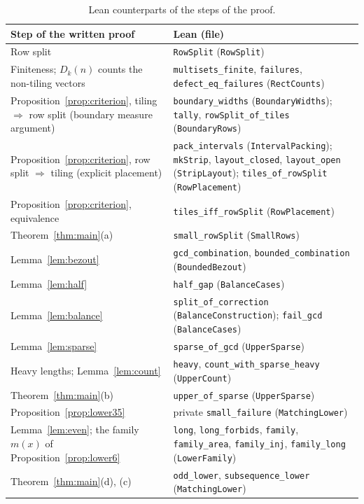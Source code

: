 \documentclass[11pt]{article}
\theoremstyle{definition}
\theoremstyle{remark}
\begin{document}
{\begin{table}[ht]
\centering\footnotesize
\renewcommand{\arraystretch}{1.05}
\begin{tabular}{@{}>{\raggedright\arraybackslash}p{}>{\raggedright\arraybackslash}p{}@{}}
\hline
Step of the written proof & Lean (file) \\
\hline
Row split &
\texttt{RowSplit} (\texttt{RowSplit}) \\
Finiteness; $D_k(n)$ counts the non-tiling vectors &
\texttt{multisets\_finite}, \texttt{failures}, \texttt{defect\_eq\_failures}
(\texttt{RectCounts}) \\
Proposition~\ref{prop:criterion}, tiling $\Rightarrow$ row split (boundary
measure argument) &
\texttt{boundary\_widths} (\texttt{BoundaryWidths}); \texttt{tally},
\texttt{rowSplit\_of\_tiles} (\texttt{BoundaryRows}) \\
Proposition~\ref{prop:criterion}, row split $\Rightarrow$ tiling (explicit
placement) &
\texttt{pack\_intervals} (\texttt{IntervalPacking}); \texttt{mkStrip},
\texttt{layout\_closed}, \texttt{layout\_open} (\texttt{StripLayout});
\texttt{tiles\_of\_rowSplit} (\texttt{RowPlacement}) \\
Proposition~\ref{prop:criterion}, equivalence &
\texttt{tiles\_iff\_rowSplit} (\texttt{RowPlacement}) \\
Theorem~\ref{thm:main}(a) &
\texttt{small\_rowSplit} (\texttt{SmallRows}) \\
Lemma~\ref{lem:bezout} &
\texttt{gcd\_combination}, \texttt{bounded\_combination}
(\texttt{BoundedBezout}) \\
Lemma~\ref{lem:half} &
\texttt{half\_gap} (\texttt{BalanceCases}) \\
Lemma~\ref{lem:balance} &
\texttt{split\_of\_correction} (\texttt{BalanceConstruction});
\texttt{fail\_gcd} (\texttt{BalanceCases}) \\
Lemma~\ref{lem:sparse} &
\texttt{sparse\_of\_gcd} (\texttt{UpperSparse}) \\
Heavy lengths; Lemma~\ref{lem:count} &
\texttt{heavy}, \texttt{count\_with\_sparse\_heavy} (\texttt{UpperCount}) \\
Theorem~\ref{thm:main}(b) &
\texttt{upper\_of\_sparse} (\texttt{UpperSparse}) \\
Proposition~\ref{prop:lower35} &
private \texttt{small\_failure} (\texttt{MatchingLower}) \\
Lemma~\ref{lem:even}; the family $m(x)$ of Proposition~\ref{prop:lower6} &
\texttt{long}, \texttt{long\_forbids}, \texttt{family}, \texttt{family\_area},
\texttt{family\_inj}, \texttt{family\_long} (\texttt{LowerFamily}) \\
Theorem~\ref{thm:main}(d), (c) &
\texttt{odd\_lower}, \texttt{subsequence\_lower} (\texttt{MatchingLower}) \\
\hline
\end{tabular}
\caption{Lean counterparts of the steps of the proof.}
\label{tab:lean}
\end{table}

}
\end{document}
